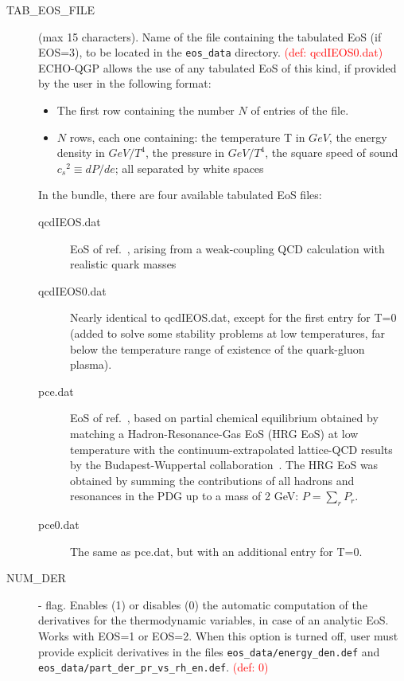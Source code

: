 \begin{description}
\item[TAB\_EOS\_FILE] \chara (max 15 characters).  Name of the file containing the tabulated EoS (if EOS=3), to be located in the {\tt eos\_data} directory.  \textcolor{red}{(def: qcdIEOS0.dat)}
ECHO-QGP allows the use of any tabulated EoS of this kind, if provided by the user in the following format: 
\begin{itemize}
\item The first row containing the number $N$ of entries of the file.
\item $N$ rows, each one containing: the temperature T in $GeV$, the energy density in $GeV/T^4$, the pressure in $GeV/T^4$, the square speed of sound ${c_s}^2\equiv dP/de$; all separated by white spaces
\end{itemize}
In the bundle, there are four available tabulated EoS files:
\begin{description}
\item[qcdIEOS.dat] EoS of ref.~\cite{Laine:2006cp}, arising
from a weak-coupling QCD calculation with realistic quark masses
\item[qcdIEOS0.dat] Nearly identical to qcdIEOS.dat, except for the first entry for T=0 (added to solve some stability problems at low temperatures, far below the temperature range of existence of the quark-gluon plasma).
\item[pce.dat] EoS of ref.~\cite{Bluhm:2013yga}, based on partial chemical equilibrium
obtained by matching a Hadron-Resonance-Gas 
EoS (HRG EoS) at low temperature with the continuum-extrapolated
lattice-QCD results by the Budapest-Wuppertal collaboration~\cite{Borsanyi:2010cj}.
The HRG EoS was obtained by summing the contributions of all hadrons and 
resonances in the PDG up to a mass of 2 GeV: $P=\sum_r P_r$. 
\item[pce0.dat] The same as pce.dat, but with an additional entry for T=0.
\end{description}
\item[NUM\_DER] \integer - flag. Enables (1) or disables (0) the automatic computation of the derivatives for the thermodynamic variables, in case of an analytic EoS. Works with EOS=1 or EOS=2.  When this option is turned off, user must provide explicit derivatives in the files {\tt eos\_data/energy\_den.def}  and {\tt eos\_data/part\_der\_pr\_vs\_rh\_en.def}. \textcolor{red}{(def: 0)}
\end{description}

